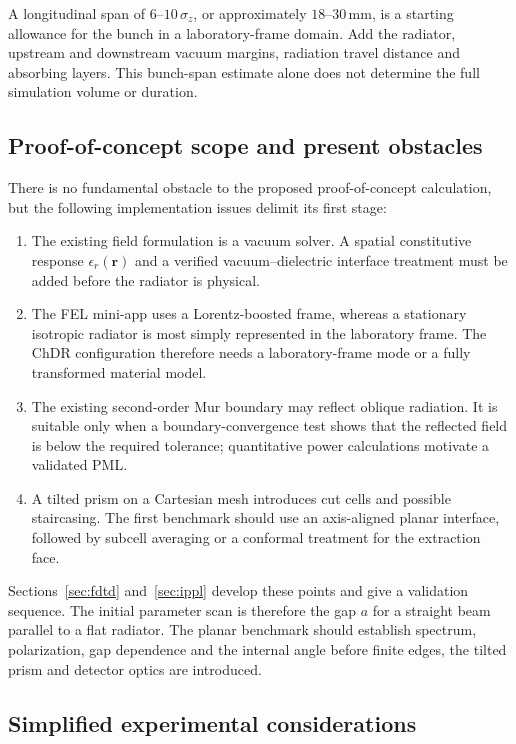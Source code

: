 \documentclass[11pt,a4paper]{article}
\newcommand{\unit}[1]{\,\mathrm{#1}}
\numberwithin{equation}{section}
\begin{document}
A longitudinal span of \(6\)--\(10\,\sigma_z\), or approximately
\(18\)--\(30\unit{mm}\), is a starting allowance for the bunch in a
laboratory-frame domain. Add the radiator, upstream and downstream vacuum
margins, radiation travel distance and absorbing layers. This bunch-span
estimate alone does not determine the full simulation volume or duration.

\subsection{Proof-of-concept scope and present obstacles}

There is no fundamental obstacle to the proposed proof-of-concept
calculation, but the following implementation issues delimit its first stage:
\begin{enumerate}[itemsep=4pt]
 \item The existing field formulation is a vacuum solver. A spatial
       constitutive response \(\epsilon_r(\mathbf r)\) and a verified
       vacuum--dielectric interface treatment must be added before the
       radiator is physical.
 \item The FEL mini-app uses a Lorentz-boosted frame, whereas a stationary
       isotropic radiator is most simply represented in the laboratory
       frame. The ChDR configuration therefore needs a laboratory-frame mode
       or a fully transformed material model.
 \item The existing second-order Mur boundary may reflect oblique radiation.
       It is suitable only when a boundary-convergence test shows that the
       reflected field is below the required tolerance; quantitative power
       calculations motivate a validated PML.
 \item A tilted prism on a Cartesian mesh introduces cut cells and possible
       staircasing. The first benchmark should use an axis-aligned planar
       interface, followed by subcell averaging or a conformal treatment for
       the extraction face.
\end{enumerate}
Sections~\ref{sec:fdtd} and~\ref{sec:ippl} develop these points and give a
validation sequence. The initial parameter scan is therefore the gap \(a\)
for a straight beam parallel to a flat radiator. The planar benchmark should
establish spectrum, polarization, gap dependence and the internal angle
before finite edges, the tilted prism and detector optics are introduced.

\subsection{Simplified experimental considerations}
\end{document}
